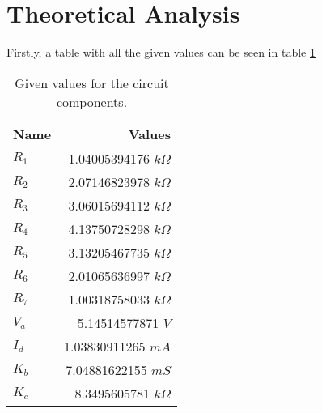 \section{Theoretical Analysis}
\label{sec:analysis}

Firstly, a table with all the given values can be seen in table \ref{tab:values}

\begin{table}[H]
  \centering
\begin{tabular}{|l|r|}
\hline
{\bf Name} & {\bf Values}         \\ \hline
$R_1$ & 1.04005394176 $k\Omega$ \\ \hline
$R_2$ & 2.07146823978 $k\Omega$ \\ \hline
$R_3$ & 3.06015694112 $k\Omega$ \\ \hline
$R_4$ & 4.13750728298 $k\Omega$ \\ \hline
$R_5$ & 3.13205467735 $k\Omega$ \\ \hline
$R_6$ & 2.01065636997 $k\Omega$ \\ \hline
$R_7$ & 1.00318758033 $k\Omega$ \\ \hline
$V_a$ & 5.14514577871 $V$ \\ \hline
$I_d$ & 1.03830911265 $mA$ \\ \hline
$K_b$ & 7.04881622155 $mS$ \\ \hline
$K_c$ & 8.3495605781 $k\Omega$ \\ \hline
\end{tabular}
\caption{Given values for the circuit components.}
\label{tab:values}
\end{table}

